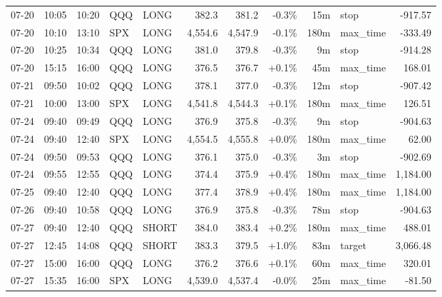 \documentclass[11pt,a4paper,twoside]{article}
\begin{document}
\begin{center}
\begin{longtable}{>{\color{txtmain}}l l l l l r r r r >{\color{txtmain}}l r}
07-20 & 10:05 & 10:20 & QQQ & LONG & 382.3 & 381.2 & \textcolor{lossred}{-0.3\%} & 15m & stop & \textcolor{lossred}{-917.57} \\
07-20 & 10:10 & 13:10 & SPX & LONG & 4,554.6 & 4,547.9 & \textcolor{lossred}{-0.1\%} & 180m & max\_time & \textcolor{lossred}{-333.49} \\
07-20 & 10:25 & 10:34 & QQQ & LONG & 381.0 & 379.8 & \textcolor{lossred}{-0.3\%} & 9m & stop & \textcolor{lossred}{-914.28} \\
07-20 & 15:15 & 16:00 & QQQ & LONG & 376.5 & 376.7 & \textcolor{wingreen}{+0.1\%} & 45m & max\_time & \textcolor{wingreen}{168.01} \\
07-21 & 09:50 & 10:02 & QQQ & LONG & 378.1 & 377.0 & \textcolor{lossred}{-0.3\%} & 12m & stop & \textcolor{lossred}{-907.42} \\
07-21 & 10:00 & 13:00 & SPX & LONG & 4,541.8 & 4,544.3 & \textcolor{wingreen}{+0.1\%} & 180m & max\_time & \textcolor{wingreen}{126.51} \\
07-24 & 09:40 & 09:49 & QQQ & LONG & 376.9 & 375.8 & \textcolor{lossred}{-0.3\%} & 9m & stop & \textcolor{lossred}{-904.63} \\
07-24 & 09:40 & 12:40 & SPX & LONG & 4,554.5 & 4,555.8 & \textcolor{wingreen}{+0.0\%} & 180m & max\_time & \textcolor{wingreen}{62.00} \\
07-24 & 09:50 & 09:53 & QQQ & LONG & 376.1 & 375.0 & \textcolor{lossred}{-0.3\%} & 3m & stop & \textcolor{lossred}{-902.69} \\
07-24 & 09:55 & 12:55 & QQQ & LONG & 374.4 & 375.9 & \textcolor{wingreen}{+0.4\%} & 180m & max\_time & \textcolor{wingreen}{1,184.00} \\
07-25 & 09:40 & 12:40 & QQQ & LONG & 377.4 & 378.9 & \textcolor{wingreen}{+0.4\%} & 180m & max\_time & \textcolor{wingreen}{1,184.00} \\
07-26 & 09:40 & 10:58 & QQQ & LONG & 376.9 & 375.8 & \textcolor{lossred}{-0.3\%} & 78m & stop & \textcolor{lossred}{-904.63} \\
07-27 & 09:40 & 12:40 & QQQ & SHORT & 384.0 & 383.4 & \textcolor{wingreen}{+0.2\%} & 180m & max\_time & \textcolor{wingreen}{488.01} \\
07-27 & 12:45 & 14:08 & QQQ & SHORT & 383.3 & 379.5 & \textcolor{wingreen}{+1.0\%} & 83m & target & \textcolor{wingreen}{3,066.48} \\
07-27 & 15:00 & 16:00 & QQQ & LONG & 376.2 & 376.6 & \textcolor{wingreen}{+0.1\%} & 60m & max\_time & \textcolor{wingreen}{320.01} \\
07-27 & 15:35 & 16:00 & SPX & LONG & 4,539.0 & 4,537.4 & \textcolor{lossred}{-0.0\%} & 25m & max\_time & \textcolor{lossred}{-81.50} \\

\end{longtable}
\end{center}
\end{document}
